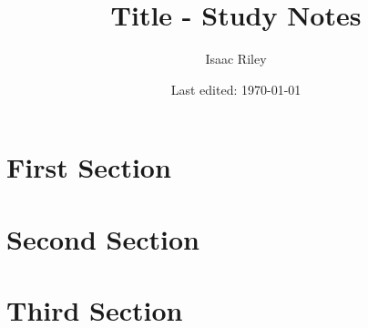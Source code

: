 \documentclass[a4paper]{article}
\title{Title - Study Notes}
\author{Isaac Riley}
\date{Last edited: \today}
\begin{document}
\maketitle
\tableofcontents
\newpage


\setcounter{section}{-1}

\section{First Section}

\section{Second Section}

\section{Third Section}

\section{}

\section{}

\section{}

\section{}


\section{}

\section{}

\subsection{}

\subsubsection{}
\end{document}
